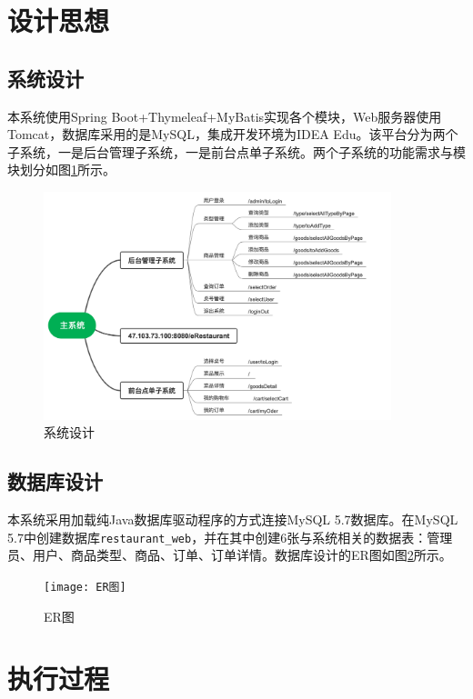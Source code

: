 \documentclass[11pt]{homework}
\begin{document}
\section*{设计思想}

  \subsection*{系统设计}
  本系统使用Spring Boot+Thymeleaf+MyBatis实现各个模块，Web服务器使用Tomcat，数据库采用的是MySQL，集成开发环境为IDEA Edu。该平台分为两个子系统，一是后台管理子系统，一是前台点单子系统。两个子系统的功能需求与模块划分如图\ref{系统设计}所示。

  \begin{figure}[htb]
    \centering
    \includegraphics[width=0.9\textwidth]{系统设计}
    \caption{系统设计}
    \label{系统设计}
  \end{figure}

  \subsection*{数据库设计}
  本系统采用加载纯Java数据库驱动程序的方式连接MySQL 5.7数据库。在MySQL 5.7中创建数据库\verb|restaurant_web|，并在其中创建6张与系统相关的数据表：管理员、用户、商品类型、商品、订单、订单详情。数据库设计的ER图如图\ref{ER图}所示。

  \begin{figure}[htb]
    \centering
    \texttt{[image: ER图]}
    \caption{ER图}
    \label{ER图}
  \end{figure} 

\section*{执行过程}
\end{document}
